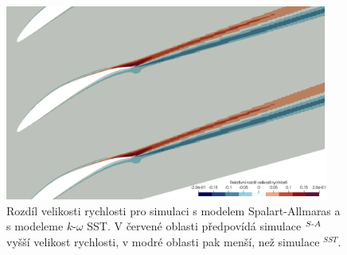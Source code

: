 \begin{figure}[H]
\centering
\includegraphics[width=0.95\textwidth]{img/sako_magUdiff.png}
\caption[Rozdíl rychlosti pro modely turbulence]{
Rozdíl velikosti rychlosti pro simulaci s modelem Spalart-Allmaras a s modeleme $k\text{-}\omega$ SST. V červené oblasti předpovídá simulace $ \null^{S\text{-}A} $ vyšší velikost rychlosti, v modré oblasti pak menší, než simulace $ ^{SST} $.}
\label{fig:ghs1_sakoUdiff}
\end{figure}







